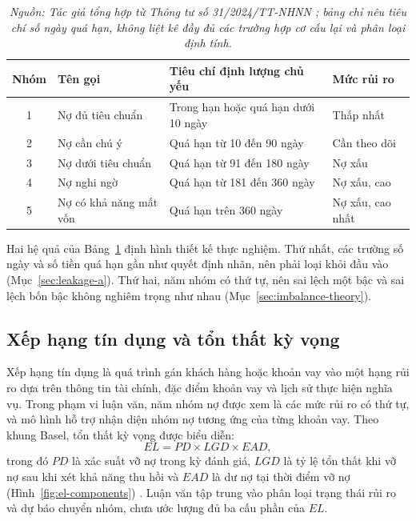 \begin{table}[H]
\centering
\caption{Năm nhóm nợ và tiêu chí định lượng chủ yếu}
\label{tab:debt-groups}
\begin{tabular}{|c|p{3.6cm}|p{4.6cm}|p{3.4cm}|}
\hline
\textbf{Nhóm} & \textbf{Tên gọi} & \textbf{Tiêu chí định lượng chủ yếu} & \textbf{Mức rủi ro}\\
\hline
1 & Nợ đủ tiêu chuẩn & Trong hạn hoặc quá hạn dưới 10 ngày & Thấp nhất\\
\hline
2 & Nợ cần chú ý & Quá hạn từ 10 đến 90 ngày & Cần theo dõi\\
\hline
3 & Nợ dưới tiêu chuẩn & Quá hạn từ 91 đến 180 ngày & Nợ xấu\\
\hline
4 & Nợ nghi ngờ & Quá hạn từ 181 đến 360 ngày & Nợ xấu, cao\\
\hline
5 & Nợ có khả năng mất vốn & Quá hạn trên 360 ngày & Nợ xấu, cao nhất\\
\hline
\end{tabular}
\caption*{\textit{Nguồn: Tác giả tổng hợp từ Thông tư số 31/2024/TT-NHNN \cite{sbv2024tt31}; bảng chỉ nêu tiêu chí số ngày quá hạn, không liệt kê đầy đủ các trường hợp cơ cấu lại và phân loại định tính.}}
\end{table}

Hai hệ quả của Bảng~\ref{tab:debt-groups} định hình thiết kế thực nghiệm. Thứ nhất, các trường số ngày và số tiền quá hạn gần như quyết định nhãn, nên phải loại khỏi đầu vào (Mục~\ref{sec:leakage-a}). Thứ hai, năm nhóm có thứ tự, nên sai lệch một bậc và sai lệch bốn bậc không nghiêm trọng như nhau (Mục~\ref{sec:imbalance-theory}).

\subsection{Xếp hạng tín dụng và tổn thất kỳ vọng}

Xếp hạng tín dụng là quá trình gán khách hàng hoặc khoản vay vào một hạng rủi ro dựa trên thông tin tài chính, đặc điểm khoản vay và lịch sử thực hiện nghĩa vụ. Trong phạm vi luận văn, năm nhóm nợ được xem là các mức rủi ro có thứ tự, và mô hình hỗ trợ nhận diện nhóm nợ tương ứng của từng khoản vay. Theo khung Basel, tổn thất kỳ vọng được biểu diễn:
\[
EL=PD\times LGD\times EAD,
\]
trong đó $PD$ là xác suất vỡ nợ trong kỳ đánh giá, $LGD$ là tỷ lệ tổn thất khi vỡ nợ sau khi xét khả năng thu hồi và $EAD$ là dư nợ tại thời điểm vỡ nợ (Hình~\ref{fig:el-components}) \cite{basel_framework}. Luận văn tập trung vào phân loại trạng thái rủi ro và dự báo chuyển nhóm, chưa ước lượng đủ ba cấu phần của $EL$.

